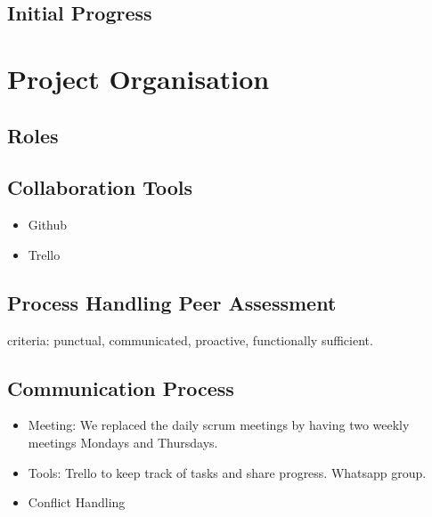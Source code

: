 \documentclass[11pt]{article}
\begin{document}
\subsection{Initial Progress}


\section{Project Organisation}
\subsection{Roles}
\subsection{Collaboration Tools}
\begin{itemize}
	\item Github
	\item Trello
\end{itemize}
\subsection{Process Handling Peer Assessment}
criteria: punctual, communicated, proactive, functionally sufficient. 
\subsection{Communication Process}
\begin{itemize}
	\item Meeting: We replaced the daily scrum meetings by having two weekly meetings Mondays and Thursdays.
	\item Tools: Trello to keep track of tasks and share progress. Whatsapp group.
	\item Conflict Handling
\end{itemize}
\end{document}
